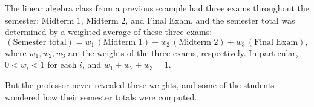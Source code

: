 \documentclass{ximera}
\begin{document}
\begin{example}
  The linear algebra class from a previous example had three exams
  throughout the semester: Midterm 1, Midterm 2, and Final Exam, and
  the semester total was determined by a weighted average of these
  three exams:
  \[
    (\text{Semester total})
    = w_1\,(\text{Midterm 1}) + w_2\,(\text{Midterm 2}) + w_3\,(\text{Final Exam}),
  \]
  where $w_1, w_2, w_3$ are the weights of the three exams,
  respectively. In particular, $0 < w_i < 1$ for each $i$, and
  $w_1 + w_2 + w_3 = 1$.

  But the professor never revealed these weights, and some of the
  students wondered how their semester totals were computed.


\end{example}
\end{document}
